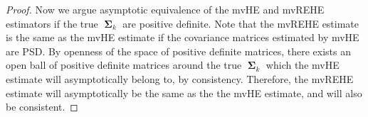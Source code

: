 \documentclass[12pt]{article}
\DeclareMathOperator{\Y}{\mathbf{Y}}
\DeclareMathOperator{\bSigma}{\mathbf{\Sigma}}
\DeclareMathOperator{\cor}{Corr}
\begin{document}
\begin{proof}

Now we argue asymptotic equivalence of the mvHE and mvREHE estimators if the true $\bSigma_k$ are positive definite. Note that the mvREHE estimate is the same as the mvHE estimate if the covariance matrices estimated by mvHE are PSD. By openness of the space of positive definite matrices, there exists an open ball of positive definite matrices around the true $\bSigma_k$ which the mvHE estimate will asymptotically belong to, by consistency. Therefore, the mvREHE estimate will asymptotically be the same as the the mvHE estimate, and will also be consistent. 
\end{proof}


\end{document}
